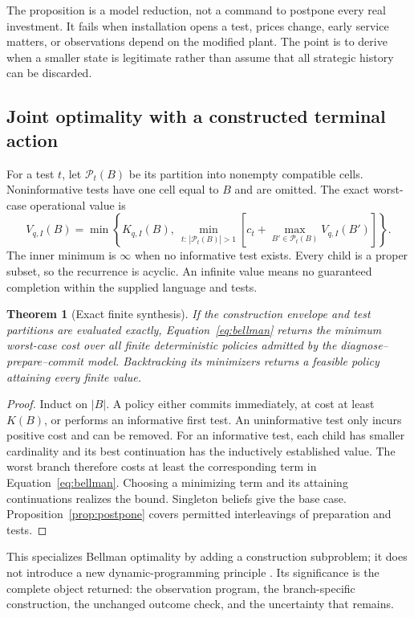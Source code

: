 \documentclass[11pt,letterpaper]{article}
\newtheorem{theorem}{Theorem}[section]
\theoremstyle{remark}\newtheorem{remark}{Remark}[section]
\begin{document}
The proposition is a model reduction, not a command to postpone every real investment. It fails when installation opens a test, prices change, early service matters, or observations depend on the modified plant. The point is to derive when a smaller state is legitimate rather than assume that all strategic history can be discarded.

\subsection{Joint optimality with a constructed terminal action}
For a test $t$, let $\mathcal P_t(B)$ be its partition into nonempty compatible cells. Noninformative tests have one cell equal to $B$ and are omitted. The exact worst-case operational value is
\begin{equation}\label{eq:bellman}
\boxed{\quad V_{q,I}(B)=\min\left\{K_{q,I}(B),\ \min_{t:\,|\mathcal P_t(B)|>1}
\left[c_t+\max_{B'\in\mathcal P_t(B)}V_{q,I}(B')\right]\right\}.\quad}
\end{equation}
The inner minimum is $\infty$ when no informative test exists. Every child is a proper subset, so the recurrence is acyclic. An infinite value means no guaranteed completion within the supplied language and tests.

\begin{theorem}[Exact finite synthesis]\label{thm:dp}
If the construction envelope and test partitions are evaluated exactly, Equation~\eqref{eq:bellman} returns the minimum worst-case cost over all finite deterministic policies admitted by the diagnose--prepare--commit model. Backtracking its minimizers returns a feasible policy attaining every finite value.
\end{theorem}
\begin{proof}
Induct on $|B|$. A policy either commits immediately, at cost at least $K(B)$, or performs an informative first test. An uninformative test only incurs positive cost and can be removed. For an informative test, each child has smaller cardinality and its best continuation has the inductively established value. The worst branch therefore costs at least the corresponding term in Equation~\eqref{eq:bellman}. Choosing a minimizing term and its attaining continuations realizes the bound. Singleton beliefs give the base case. Proposition~\ref{prop:postpone} covers permitted interleavings of preparation and tests.
\end{proof}

This specializes Bellman optimality by adding a construction subproblem; it does not introduce a new dynamic-programming principle \citep{kaelbling}. Its significance is the complete object returned: the observation program, the branch-specific construction, the unchanged outcome check, and the uncertainty that remains.
\end{document}

